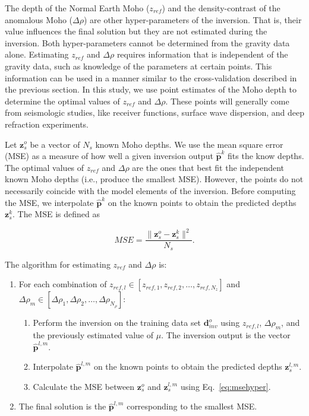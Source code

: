 \documentclass[extra,mreferee]{gji}
\begin{document}
The depth of the Normal Earth Moho ($z_{ref}$)
and the density-contrast of the anomalous Moho ($\Delta\rho$)
are other hyper-parameters of the inversion.
That is, their value influences the final solution
but they are not estimated during the inversion.
Both hyper-parameters cannot be determined from the gravity data alone.
Estimating $z_{ref}$ and $\Delta\rho$ requires
information that is independent of the gravity data,
such as knowledge of the parameters at certain points.
This information can be used in a manner similar to
the cross-validation described in the previous section.
In this study, we use point estimates of the Moho depth
to determine the optimal values of $z_{ref}$ and $\Delta\rho$.
These points will generally come from seismologic studies,
like receiver functions, surface wave dispersion, and deep refraction
experiments.

Let $\mathbf{z}_s^o$ be a vector of $N_s$ known Moho depths.
We use the mean square error (MSE)
as a measure of how well a given inversion output $\mathbf{\hat{p}}^k$
fits the know depths.
The optimal values of $z_{ref}$ and $\Delta\rho$
are the ones that best fit the independent known Moho depths
(i.e., produce the smallest MSE).
However, the points do not necessarily coincide
with the model elements of the inversion.
Before computing the MSE,
we interpolate $\mathbf{\hat{p}}^k$ on the known points
to obtain the predicted depths $\mathbf{z}_s^k$.
The MSE is defined as

\begin{equation}
    MSE = \dfrac{\|\mathbf{z}^o_s - \mathbf{z}^k_{s}\|^2}{N_s}.
    \label{eq:msehyper}
\end{equation}

The algorithm for estimating $z_{ref}$ and $\Delta\rho$ is:

\begin{enumerate}
    \item For each combination of
        $z_{ref,l} \in [z_{ref,1},z_{ref,2},\ldots,z_{ref,N_z}]$ and
        $\Delta\rho_m \in
         [\Delta\rho_1,\Delta\rho_2,\ldots,\Delta\rho_{N_{\rho}}]$:
    \begin{enumerate}
        \item Perform the inversion on the training data set
            $\mathbf{d}^o_{inv}$ using $z_{ref,l}$, $\Delta\rho_m$, and
            the previously estimated value of $\mu$.
            The inversion output is the vector $\mathbf{\hat{p}}^{l,m}$.
        \item Interpolate $\mathbf{\hat{p}}^{l,m}$
            on the known points to obtain the predicted depths
            $\mathbf{z}_s^{l,m}$.
        \item Calculate the MSE between $\mathbf{z}_s^o$ and
            $\mathbf{z}_s^{l,m}$ using Eq.~\ref{eq:msehyper}.
    \end{enumerate}
    \item The final solution is the $\mathbf{\hat{p}}^{l,m}$ corresponding to
        the smallest MSE.
\end{enumerate}
\end{document}
